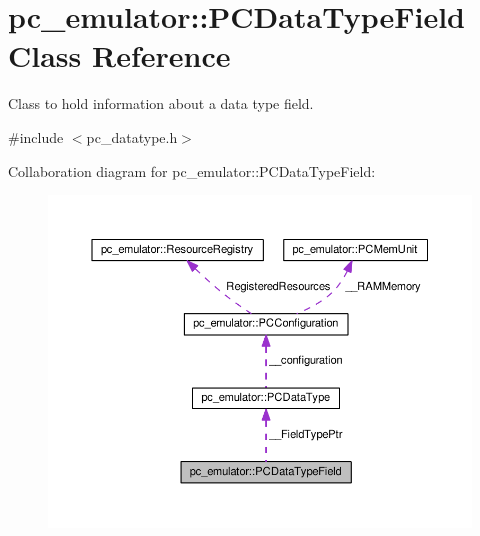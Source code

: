 \hypertarget{classpc__emulator_1_1PCDataTypeField}{}\section{pc\+\_\+emulator\+:\+:P\+C\+Data\+Type\+Field Class Reference}
\label{classpc__emulator_1_1PCDataTypeField}


Class to hold information about a data type field.  




{\ttfamily \#include $<$pc\+\_\+datatype.\+h$>$}



Collaboration diagram for pc\+\_\+emulator\+:\+:P\+C\+Data\+Type\+Field\+:\nopagebreak
\begin{figure}[H]
\begin{center}
\leavevmode
\includegraphics[width=350pt]{classpc__emulator_1_1PCDataTypeField__coll__graph}
\end{center}
\end{figure}
